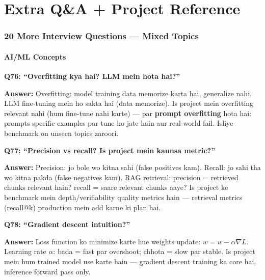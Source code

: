 \newpage

\part{Extra Q\&A + Project Reference}

\section{20 More Interview Questions --- Mixed Topics}

\subsection{AI/ML Concepts}

\begin{interviewbox}
\textbf{Q76: ``Overfitting kya hai? LLM mein hota hai?''}

\textbf{Answer:} Overfitting: model training data memorize karta hai, generalize nahi. LLM fine-tuning mein ho sakta hai (data memorize). Is project mein overfitting relevant nahi (hum fine-tune nahi karte) --- par \textbf{prompt overfitting} hota hai: prompts specific examples par tune ho jate hain aur real-world fail. Isliye benchmark on unseen topics zaroori.
\end{interviewbox}

\begin{interviewbox}
\textbf{Q77: ``Precision vs recall? Is project mein kaunsa metric?''}

\textbf{Answer:} Precision: jo bole wo kitna sahi (false positives kam). Recall: jo sahi tha wo kitna pakda (false negatives kam). RAG retrieval: precision = retrieved chunks relevant hain? recall = saare relevant chunks aaye? Is project ke benchmark mein depth/verifiability quality metrics hain --- retrieval metrics (recall@k) production mein add karne ki plan hai.
\end{interviewbox}

\begin{interviewbox}
\textbf{Q78: ``Gradient descent intuition?''}

\textbf{Answer:} Loss function ko minimize karte hue weights update: $w = w - \alpha \nabla L$. Learning rate $\alpha$: bada = fast par overshoot; chhota = slow par stable. Is project mein hum trained model use karte hain --- gradient descent training ka core hai, inference forward pass only.
\end{interviewbox}

